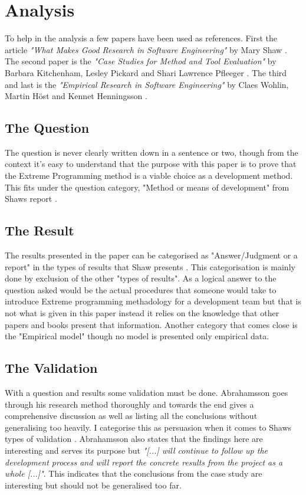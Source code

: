 \section{Analysis}
To help in the analysis a few papers have been used as references. First the
article {\em "What Makes Good Research in Software Engineering"} by Mary Shaw
\cite{shaw2002}. The second paper is the {\em "Case Studies for Method and Tool
Evaluation"} by Barbara Kitchenham, Lesley Pickard and Shari Lawrence Pfleeger
\cite{kitchenham1995}. The third and last is the {\em "Empirical Research in
Software Engineering"} by Claes Wohlin, Martin H\"{o}st and Kennet Henningsson
\cite{wohlin2003}.

\subsection{The Question}
The question is never clearly written down in a sentence or two, though from the
context it's easy to understand that the purpose with this paper is to prove that
the Extreme Programming method is a viable choice as a development method. This
fits under the question category, "Method or means of development" from Shaws
report \cite{shaw2002}.

\subsection{The Result}
The results presented in the paper can be categorised as "Answer/Judgment or a
report" in the types of results that Shaw presents \cite{shaw2002}. This
categorisation is mainly done by exclusion of the other "types of results". As
a logical answer to the question asked would be the actual procedures that
someone would take to introduce Extreme programming methadology for a development team but that is not what is
given in this paper instead it relies on the knowledge that other papers and books
present that information. Another category that comes close is the "Empirical
model" though no model is presented only empirical data.

\subsection{The Validation}
With a question and results some validation must be done. Abrahamsson goes
through his research method thoroughly and towards the end gives a
comprehensive discussion as well as listing all the conclusions without generalising
too heavily. I categorise this as persuasion when it comes to Shaws types of
validation \cite{shaw2002}. Abrahamsson also states that the findings here are
interesting and serves its purpose but {\em "[...] will continue to follow up
    the development process and will report the concrete results from the
project as a whole [...]"}. This indicates that the conclusions from the
    case study are interesting but should not be generalised too far.

